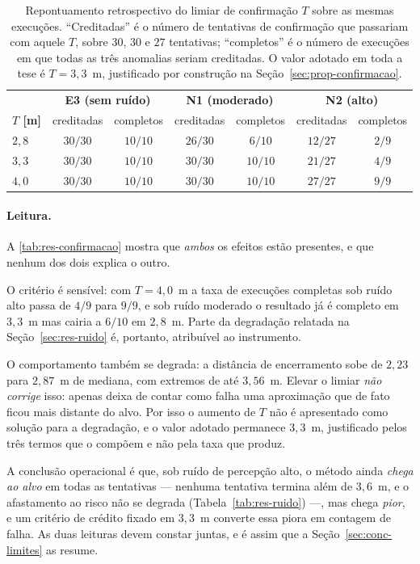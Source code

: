 \begin{table}[htb]
\centering
\caption{Repontuamento retrospectivo do limiar de confirmação $T$ sobre as mesmas
execuções. ``Creditadas'' é o número de tentativas de confirmação que passariam com
aquele $T$, sobre $30$, $30$ e $27$ tentativas; ``completos'' é o número de execuções
em que todas as três anomalias seriam creditadas. O valor adotado em toda a tese é
$T=3{,}3$~m, justificado por construção na Seção~\ref{sec:prop-confirmacao}.}
\label{tab:res-confirmacao}
\footnotesize
\begin{tabular}{lcccccc}
\hline
 & \multicolumn{2}{c}{\textbf{E3 (sem ruído)}}
 & \multicolumn{2}{c}{\textbf{N1 (moderado)}}
 & \multicolumn{2}{c}{\textbf{N2 (alto)}}\\
\textbf{$T$ [m]} & creditadas & completos & creditadas & completos & creditadas &
completos\\
\hline
$2{,}8$ & $30/30$ & $10/10$ & $26/30$ & $6/10$ & $12/27$ & $2/9$\\
$3{,}3$ & $30/30$ & $10/10$ & $30/30$ & $10/10$ & $21/27$ & $4/9$\\
$4{,}0$ & $30/30$ & $10/10$ & $30/30$ & $10/10$ & $27/27$ & $9/9$\\
\hline
\end{tabular}
\end{table}

\paragraph*{Leitura.} A \autoref{tab:res-confirmacao} mostra que \emph{ambos} os
efeitos estão presentes, e que nenhum dos dois explica o outro.

O critério é sensível: com $T=4{,}0$~m a taxa de execuções completas sob ruído alto
passa de $4/9$ para $9/9$, e sob ruído moderado o resultado já é completo em $3{,}3$~m
mas cairia a $6/10$ em $2{,}8$~m. Parte da degradação relatada na
Seção~\ref{sec:res-ruido} é, portanto, atribuível ao instrumento.

O comportamento também se degrada: a distância de encerramento sobe de $2{,}23$ para
$2{,}87$~m de mediana, com extremos de até $3{,}56$~m. Elevar o limiar \emph{não
corrige} isso: apenas deixa de contar como falha uma aproximação que de fato ficou
mais distante do alvo. Por isso o aumento de $T$ não é apresentado como solução para a
degradação, e o valor adotado permanece $3{,}3$~m, justificado pelos três termos que o
compõem e não pela taxa que produz.

A conclusão operacional é que, sob ruído de percepção alto, o método ainda \emph{chega
ao alvo} em todas as tentativas --- nenhuma tentativa termina além de $3{,}6$~m, e o
afastamento ao risco não se degrada (Tabela~\ref{tab:res-ruido}) ---, mas chega
\emph{pior}, e um critério de crédito fixado em $3{,}3$~m converte essa piora em
contagem de falha. As duas leituras devem constar juntas, e é assim que a
Seção~\ref{sec:conc-limites} as resume.

